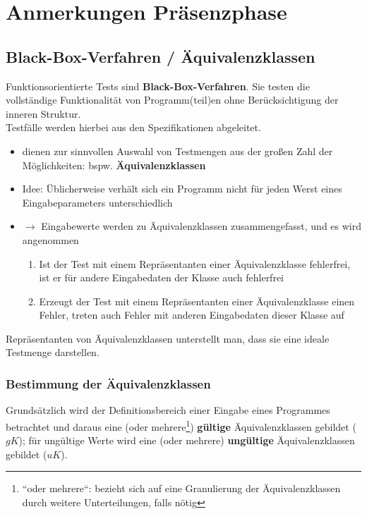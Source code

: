 \chapter{Anmerkungen Präsenzphase}

\section{Black-Box-Verfahren / Äquivalenzklassen}

Funktionsorientierte Tests sind \textbf{Black-Box-Verfahren}.
Sie testen die vollständige Funktionalität von Programm(teil)en ohne Berücksichtigung der inneren Struktur.\\
Testfälle werden hierbei aus den Spezifikationen abgeleitet.

\begin{itemize}
    \item dienen zur sinnvollen Auswahl von Testmengen aus der großen Zahl der Möglichkeiten: bspw. \textbf{Äquivalenzklassen}
    \item Idee: Üblicherweise verhält sich ein Programm nicht für jeden Werst eines Eingabeparameters unterschiedlich
    \item[] $\rightarrow$ Eingabewerte werden zu Äquivalenzklassen zusammengefasst, und es wird angenommen
    \begin{enumerate}
        \item Ist der Test mit einem Repräsentanten einer Äquivalenzklasse fehlerfrei, ist er für andere Eingabedaten der Klasse auch fehlerfrei
        \item Erzeugt der Test mit einem Repräsentanten einer Äquivalenzklasse einen Fehler, treten auch Fehler mit anderen Eingabedaten dieser Klasse auf
    \end{enumerate}
\end{itemize}

\vspace{5mm}
\begin{tcolorbox}[title={Ideale Testmenge}]
    Repräsentanten von Äquivalenzklassen unterstellt man, dass sie eine ideale Testmenge darstellen.
\end{tcolorbox}

\subsection*{Bestimmung der Äquivalenzklassen}

Grundsätzlich wird der Definitionsbereich einer Eingabe eines Programmes betrachtet und daraus eine (oder mehrere\footnote{
``oder mehrere``: bezieht sich auf eine Granulierung der Äquivalenzklassen durch weitere Unterteilungen, falls nötig
}) \textbf{gültige} Äquivalenzklassen gebildet ($gK$); für ungültige Werte wird eine (oder mehrere) \textbf{ungültige} Äquivalenzklassen gebildet ($uK$).\\

